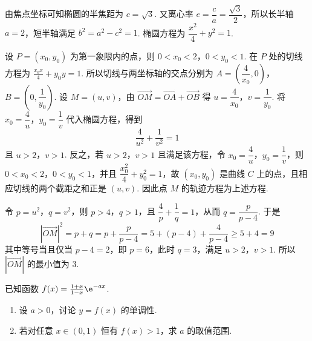\begin{solution}
由焦点坐标可知椭圆的半焦距为 \(c=\sqrt3\). 又离心率 \(e=\dfrac ca=\dfrac{\sqrt3}{2}\)，所以长半轴 \(a=2\)，短半轴满足 \(b^2=a^2-c^2=1\). 椭圆方程为 \(\dfrac{x^2}{4}+y^2=1\).

设 \(P=(x_0,y_0)\) 为第一象限内的点，则 \(0<x_0<2\)，\(0<y_0<1\). 在 \(P\) 处的切线方程为 \(\frac{x_0x}{4}+y_0y=1\).
所以切线与两坐标轴的交点分别为 \(A=\left(\dfrac4{x_0},0\right)\)，\(B=\left(0,\dfrac1{y_0}\right)\). 设 \(M=(u,v)\)，由 \(\overrightarrow{OM}=\overrightarrow{OA}+\overrightarrow{OB}\) 得 \(u=\dfrac4{x_0}\)，\(v=\dfrac1{y_0}\). 将 \(x_0=\dfrac4u\)，\(y_0=\dfrac1v\) 代入椭圆方程，得到
\[
\frac4{u^2}+\frac1{v^2}=1
\]
且 \(u>2\)，\(v>1\). 反之，若 \(u>2\)，\(v>1\) 且满足该方程，令 \(x_0=\dfrac4u\)，\(y_0=\dfrac1v\)，则 \(0<x_0<2\)，\(0<y_0<1\)，并且 \(\dfrac{x_0^2}{4}+y_0^2=1\)，故 \((x_0,y_0)\) 是曲线 \(C\) 上的点，且相应切线的两个截距之和正是 \((u,v)\). 因此点 \(M\) 的轨迹方程为上述方程.

令 \(p=u^2\)，\(q=v^2\)，则 \(p>4\)，\(q>1\)，且 \(\dfrac4p+\dfrac1q=1\)，从而 \(q=\dfrac p{p-4}\). 于是
\[
|\overrightarrow{OM}|^2=p+q=p+\frac p{p-4}=5+(p-4)+\frac4{p-4}\geq5+4=9
\]
其中等号当且仅当 \(p-4=2\)，即 \(p=6\)，此时 \(q=3\)，满足 \(u>2\)，\(v>1\). 所以 \(|\overrightarrow{OM}|\) 的最小值为 \(3\).
\end{solution}

\begin{problem}
已知函数 \(f(x)=\frac{1+x}{1-x}\e^{-ax}\).

\begin{enumerate}
\item 设 \(a>0\)，讨论 \(y=f(x)\) 的单调性.
\item 若对任意 \(x\in(0,1)\) 恒有 \(f(x)>1\)，求 \(a\) 的取值范围.
\end{enumerate}
\end{problem}

